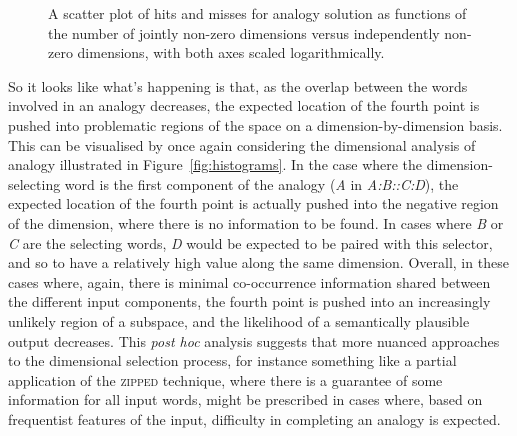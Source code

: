 \begin{figure}
\caption[Analogical Hits and Misses]{A scatter plot of hits and misses for analogy solution as functions of the number of jointly non-zero dimensions versus independently non-zero dimensions, with both axes scaled logarithmically.}
\label{fig:xando}
\end{figure}

So it looks like what's happening is that, as the overlap between the words involved in an analogy decreases, the expected location of the fourth point is pushed into problematic regions of the space on a dimension-by-dimension basis.  This can be visualised by once again considering the dimensional analysis of analogy illustrated in Figure~\ref{fig:histograms}.  In the case where the dimension-selecting word is the first component of the analogy (\emph{A} in \emph{A:B::C:D}), the expected location of the fourth point is actually pushed into the negative region of the dimension, where there is no information to be found.  In cases where \emph{B} or \emph{C} are the selecting words, \emph{D} would be expected to be paired with this selector, and so to have a relatively high value along the same dimension.  Overall, in these cases where, again, there is minimal co-occurrence information shared between the different input components, the fourth point is pushed into an increasingly unlikely region of a subspace, and the likelihood of a semantically plausible output decreases.  This \emph{post hoc} analysis suggests that more nuanced approaches to the dimensional selection process, for instance something like a partial application of the \textsc{zipped} technique, where there is a guarantee of some information for all input words, might be prescribed in cases where, based on frequentist features of the input, difficulty in completing an analogy is expected.

